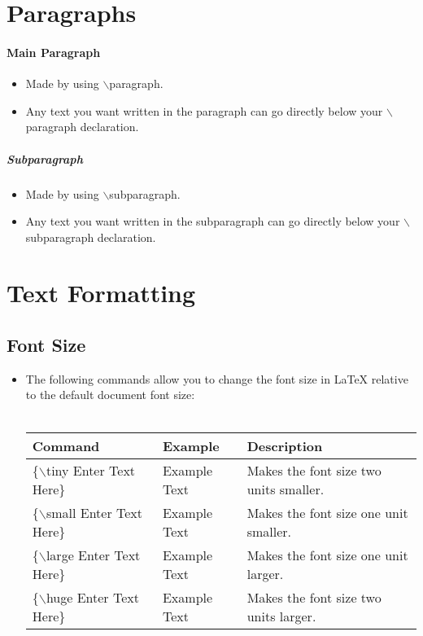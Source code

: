 \documentclass{article}
\begin{document}
	\section{Paragraphs}
		\paragraph{Main Paragraph}
			\begin{itemize}
				\item Made by using $\backslash$paragraph.
				\item Any text you want written in the paragraph can go directly below your $\backslash$paragraph declaration.
			\end{itemize}
	
		\subparagraph{Subparagraph}
			\begin{itemize}
				\item Made by using $\backslash$subparagraph.
				\item Any text you want written in the subparagraph can go directly below your $\backslash$subparagraph declaration.
			\end{itemize}
	
	\section{Text Formatting}
		\subsection{Font Size}
			\begin{itemize}
				\item The following commands allow you to change the font size in \LaTeX{} relative to the default document font size:\\\\
				\def\arraystretch{2.25}
				\begin{tabularx}{\textwidth}{|l|X|X|}
					\hline
					Command & Example & Description\\
					\hline
					\{$\backslash$tiny Enter Text Here\} & {\tiny Example Text} & Makes the font size two units smaller.\\
					\hline
					\{$\backslash$small Enter Text Here\} & {\small Example Text} & Makes the font size one unit smaller.\\
					\hline
					\{$\backslash$large Enter Text Here\} & {\large Example Text} & Makes the font size one unit larger.\\
					\hline
					\{$\backslash$huge Enter Text Here\} & {\huge Example Text} & Makes the font size two units larger.\\
					\hline
				\end{tabularx}
			\end{itemize}
\end{document}
